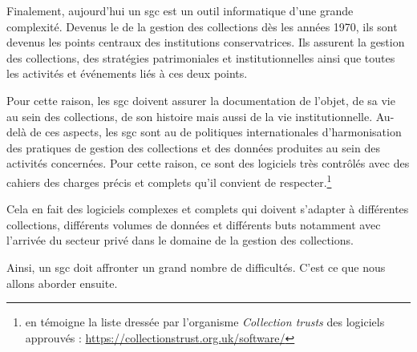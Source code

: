 Finalement, aujourd'hui un \gls{sgc} est un outil informatique d'une grande complexité. Devenus le \coeur de la gestion des collections dès les années 1970, ils sont devenus les points centraux des institutions conservatrices. Ils assurent la gestion des collections, des stratégies patrimoniales et institutionnelles ainsi que toutes les activités et événements liés à ces deux points. 

Pour cette raison, les \gls{sgc} doivent assurer la documentation de l'objet, de sa vie au sein des collections, de son histoire mais aussi de la vie institutionnelle. Au-delà de ces aspects, les \gls{sgc} sont au \coeur de politiques internationales d'harmonisation des pratiques de gestion des collections et des données produites au sein des activités concernées. Pour cette raison, ce sont des logiciels très contrôlés avec des cahiers des charges précis et complets qu'il convient de respecter.\footnote{en témoigne la liste dressée par l'organisme \textit{Collection trusts} des logiciels approuvés : \url{https://collectionstrust.org.uk/software/}}

Cela en fait des logiciels complexes et complets qui doivent s'adapter à différentes collections, différents volumes de données et différents buts notamment avec l'arrivée du secteur privé dans le domaine de la gestion des collections. 

Ainsi, un \gls{sgc} doit affronter un grand nombre de difficultés. C'est ce que nous allons aborder ensuite. 
